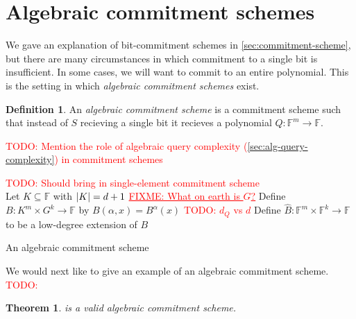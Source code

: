 \documentclass[english,12pt]{reedthesis}
\theoremstyle{plain}
\newtheorem{thm}{Theorem}[section]
\theoremstyle{definition}
\newtheorem{defn}[defn]{Definition}
\theoremstyle{remark}
\DeclarePairedDelimiter{\abs}{\lvert}{\rvert}
\newcommand{\TODO}[1]{\textcolor{red}{TODO: #1}}
\newcommand{\FIXME}[1]{\textcolor{red}{\ul{FIXME: #1}}}
\begin{document}

\section{Algebraic commitment schemes}\label{sec:alg-commit-scheme}

We gave an explanation of bit-commitment schemes in
\cref{sec:commitment-scheme}, but there are many circumstances in which
commitment to a single bit is insufficient. In some cases, we will want to
commit to an entire polynomial. This is the setting in which \emph{algebraic
  commitment schemes} exist.

\begin{defn}\label{def:alg-comm-scheme}
  An \emph{algebraic commitment scheme} is a commitment scheme such that instead
  of $S$ recieving a single bit it recieves a polynomial
  $Q\colon \mathbb{F}^{m} \rightarrow \mathbb{F}$.
\end{defn}

\TODO{Mention the role of algebraic query complexity
  (\cref{sec:alg-query-complexity}) in commitment schemes}

\begin{algorithm}[htbp]
  \TODO{Should bring in single-element commitment scheme} \\
  Let $K \subseteq \mathbb{F}$ with $\abs{K} = d + 1$\;
  \FIXME{What on earth is $G$?}
  Define $B\colon K^{m} \times G^{k} \rightarrow \mathbb{F}$ by $B(\alpha, x) = B^{\alpha}(x)$\;
  \TODO{$d_{Q}$ vs $d$}
  Define $\hat{B}\colon \mathbb{F}^{m} \times \mathbb{F}^{k} \rightarrow \mathbb{F}$ to be a
  low-degree extension of
  $B$
  \;
  \caption{An algebraic commitment scheme~\cite[]{CFGS22}}\label{alg:alg-commit-scheme}
\end{algorithm}

We would next like to give an example of an algebraic commitment scheme. \TODO{}

\begin{thm}\label{thm:alg-commit-scheme}
   is a valid algebraic commitment scheme.
\end{thm}
\end{document}
